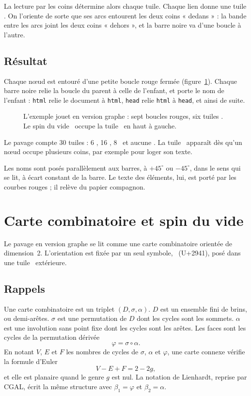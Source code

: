 \documentclass[11pt,a4paper]{article}
\theoremstyle{remark}
\newcommand{\balise}[1]{\texttt{#1}}
\newcommand{\fig}[1]{}
\begin{document}
La lecture par les coins détermine alors chaque tuile. Chaque lien donne une
tuile \CONNECT. On l'oriente de sorte que ses arcs entourent les deux coins
« dedans » : la bande entre les arcs joint les deux coins « dehors », et la barre
noire va d'une boucle à l'autre.

\subsection{Résultat}

Chaque nœud est entouré d'une petite boucle rouge fermée
(figure~\ref{f:graphe}). Chaque barre noire relie la boucle du parent à celle de
l'enfant, et porte le nom de l'enfant : \balise{html} relie le document à
\balise{html}, \balise{head} relie \balise{html} à \balise{head}, et ainsi de
suite.

\begin{figure}[ht]
  \centering
  \fig{fig-graphe}
  \caption{L'exemple jouet en version graphe : sept boucles rouges, six tuiles
    \CONNECT. Le spin du vide \spin\ occupe la tuile \VIDE\ en haut à gauche.}
  \label{f:graphe}
\end{figure}

Le pavage compte 30 tuiles : 6 \CONNECT, 16 \VIRAGE, 8 \VIDE\ et aucune \DROIT.
La tuile \DROIT\ apparaît dès qu'un nœud occupe plusieurs coins, par exemple pour
loger son texte.

Les noms sont posés parallèlement aux barres, à $+45^\circ$ ou $-45^\circ$, dans
le sens qui se lit, à écart constant de la barre. Le texte des éléments, lui,
est porté par les courbes rouges ; il relève du papier compagnon.

\section{Carte combinatoire et spin du vide}\label{s:carte}

Le pavage en version graphe se lit comme une carte combinatoire orientée de
dimension~2. L'orientation est fixée par un seul symbole, \spin\ (U+2941), posé
dans une tuile \VIDE\ extérieure.

\subsection{Rappels}

Une carte combinatoire est un triplet $(D,\sigma,\alpha)$. $D$ est un ensemble
fini de brins, ou demi-arêtes. $\sigma$ est une permutation de $D$ dont les
cycles sont les sommets. $\alpha$ est une involution sans point fixe dont les
cycles sont les arêtes. Les faces sont les cycles de la permutation dérivée
\[
  \varphi = \sigma\circ\alpha .
\]
En notant $V$, $E$ et $F$ les nombres de cycles de $\sigma$, $\alpha$ et
$\varphi$, une carte connexe vérifie la formule d'Euler
\[
  V - E + F = 2 - 2g ,
\]
et elle est planaire quand le genre $g$ est nul. La notation de Lienhardt,
reprise par CGAL, écrit la même structure avec $\beta_1=\varphi$ et
$\beta_2=\alpha$.
\end{document}
